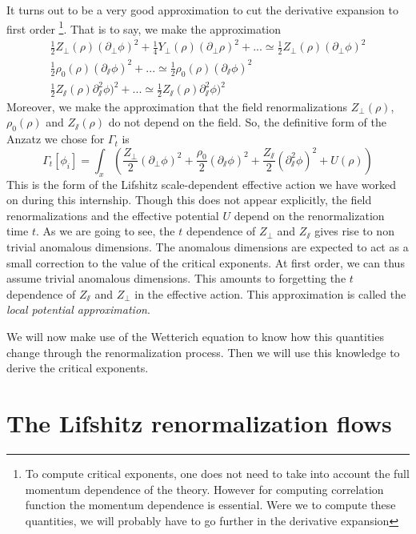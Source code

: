 It turns out to be a very good approximation to cut the derivative expansion to first order \footnote{To compute critical exponents, one does not need to take into account the full momentum dependence of the theory. However for computing correlation function the momentum dependence is essential. Were we to compute these quantities, we will probably have to go further in the derivative expansion}. That is to say, we make the approximation
\begin{eqnarray}
\frac{1}{2} Z_\perp(\rho) (\partial_\perp \phi)^2 + \frac{1}{4} Y_\perp(\rho) (\partial_\perp \rho)^2 + ...  \simeq  \frac{1}{2} Z_\perp(\rho) (\partial_\perp \phi)^2  \\
 \frac{1}{2} \rho_0(\rho) (\partial_\sslash \phi)^2 + ...  \simeq  \frac{1}{2} \rho_0(\rho) (\partial_\sslash \phi)^2 \\
\frac{1}{2} Z_\sslash(\rho) \partial_\sslash^2 \phi)^2 + ... \simeq \frac{1}{2} Z_\sslash(\rho) \partial_\sslash^2 \phi)^2
\end{eqnarray}
Moreover, we make the approximation that the field renormalizations $Z_\perp(\rho)$, $\rho_0(\rho)$ and $Z_\sslash(\rho)$ do not depend on the field. So, the definitive form of the Anzatz we chose for $\Gamma_t$ is
\begin{equation}
\label{eq:gamlif}
\Gamma_t[\phi_i] = \int_x \left ( \frac{Z_\perp}{2} (\partial_\perp \phi)^2 + \frac{\rho_0}{2} (\partial_\sslash \phi)^2 + \frac{Z_\sslash}{2} (\partial_\sslash^2 \phi)^2 + U(\rho) \right )
\end{equation}
This is the form of the Lifshitz scale-dependent effective action we have worked on during this internship.
Though this does not appear explicitly, the field renormalizations and the effective potential $U$ depend on the renormalization time $t$. As we are going to see, the $t$ dependence of $Z_\perp$ and $Z_\sslash$ gives rise to non trivial anomalous dimensions. The anomalous dimensions are expected to act as a small correction to the value of the critical exponents. At first order, we can thus assume trivial anomalous dimensions. This amounts to forgetting the $t$ dependence of $Z_\sslash$ and $Z_\perp$ in the effective action. This approximation is called the \textit{local potential approximation}.


 We will now make use of the Wetterich equation to know how this quantities change through the renormalization process. Then we will use this knowledge to derive the critical exponents.

\section{The Lifshitz renormalization flows}

